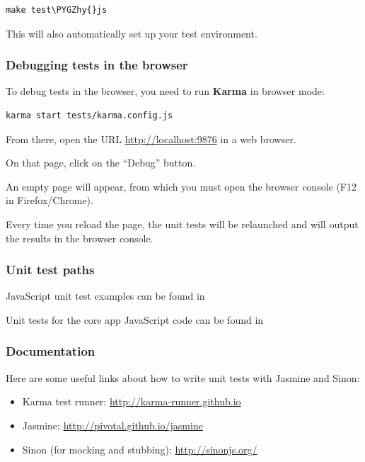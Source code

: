 \documentclass[letterpaper,10pt,english]{sphinxmanual}
\def\PYGZhy{\char`\-}
\begin{document}
\begin{Verbatim}[commandchars=\\\{\}]
make test\PYGZhy{}js
\end{Verbatim}

This will also automatically set up your test environment.


\subsubsection{Debugging tests in the browser}
\label{core/unit-testing:debugging-tests-in-the-browser}
To debug tests in the browser, you need to run \textbf{Karma} in browser mode:

\begin{Verbatim}[commandchars=\\\{\}]
karma start tests/karma.config.js
\end{Verbatim}

From there, open the URL \href{http://localhost:9876}{http://localhost:9876} in a web browser.

On that page, click on the ``Debug'' button.

An empty page will appear, from which you must open the browser console (F12 in Firefox/Chrome).

Every time you reload the page, the unit tests will be relaunched and will output the results in the browser console.


\subsubsection{Unit test paths}
\label{core/unit-testing:unit-test-paths}
JavaScript unit test examples can be found in 

Unit tests for the core app JavaScript code can be found in 


\subsubsection{Documentation}
\label{core/unit-testing:documentation}
Here are some useful links about how to write unit tests with Jasmine and Sinon:
\begin{itemize}
\item {} 
Karma test runner: \href{http://karma-runner.github.io}{http://karma-runner.github.io}

\item {} 
Jasmine: \href{http://pivotal.github.io/jasmine}{http://pivotal.github.io/jasmine}

\item {} 
Sinon (for mocking and stubbing): \href{http://sinonjs.org/}{http://sinonjs.org/}

\end{itemize}
\end{document}
